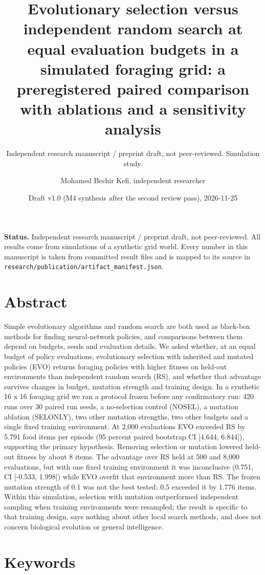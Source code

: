 \documentclass[
]{article}
\title{Evolutionary selection versus independent random search at equal
evaluation budgets in a simulated foraging grid: a preregistered paired
comparison with ablations and a sensitivity analysis}
\subtitle{Independent research manuscript / preprint draft, not
peer-reviewed. Simulation study.}
\author{Mohamed Bechir Kefi, independent researcher}
\date{Draft v1.0 (M4 synthesis after the second review pass),
2026-11-25}
\begin{document}
\maketitle

\textbf{Status.} Independent research manuscript / preprint draft, not
peer-reviewed. All results come from simulations of a synthetic grid
world. Every number in this manuscript is taken from committed result
files and is mapped to its source in
\texttt{research/publication/artifact\_manifest.json}.

\section{Abstract}\label{abstract}

Simple evolutionary algorithms and random search are both used as
black-box methods for finding neural-network policies, and comparisons
between them depend on budgets, seeds and evaluation details. We asked
whether, at an equal budget of policy evaluations, evolutionary
selection with inherited and mutated policies (EVO) returns foraging
policies with higher fitness on held-out environments than independent
random search (RS), and whether that advantage survives changes in
budget, mutation strength and training design. In a synthetic 16 x 16
foraging grid we ran a protocol frozen before any confirmatory run: 420
runs over 30 paired run seeds, a no-selection control (NOSEL), a
mutation ablation (SELONLY), two other mutation strengths, two other
budgets and a single fixed training environment. At 2,000 evaluations
EVO exceeded RS by 5.791 food items per episode (95 percent paired
bootstrap CI {[}4.644, 6.844{]}), supporting the primary hypothesis.
Removing selection or mutation lowered held-out fitness by about 8
items. The advantage over RS held at 500 and 8,000 evaluations, but with
one fixed training environment it was inconclusive (0.751, CI {[}-0.533,
1.998{]}) while EVO overfit that environment more than RS. The frozen
mutation strength of 0.1 was not the best tested: 0.5 exceeded it by
1.776 items. Within this simulation, selection with mutation
outperformed independent sampling when training environments were
resampled; the result is specific to that training design, says nothing
about other local search methods, and does not concern biological
evolution or general intelligence.

\section{Keywords}\label{keywords}
\end{document}
